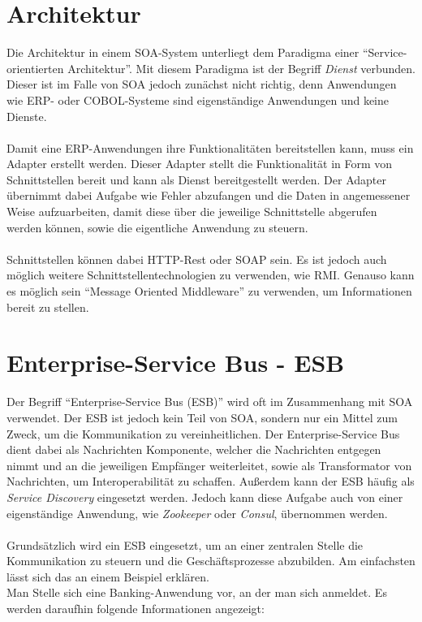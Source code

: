 \section{Architektur}
\label{sec:SoaArchitektur}
Die Architektur in einem SOA-System unterliegt dem Paradigma einer "`Service-orientierten Architektur"'. Mit diesem Paradigma ist der Begriff \textit{Dienst} verbunden. Dieser ist im Falle von SOA jedoch zunächst nicht richtig, denn Anwendungen wie ERP- oder COBOL-Systeme sind eigenständige Anwendungen und keine Dienste.
\\\\
Damit eine ERP-Anwendungen ihre Funktionalitäten bereitstellen kann, muss ein Adapter erstellt werden. Dieser Adapter stellt die Funktionalität in Form von Schnittstellen bereit und kann als Dienst bereitgestellt werden. Der Adapter übernimmt dabei Aufgabe wie Fehler abzufangen und die Daten in angemessener Weise aufzuarbeiten, damit diese über die jeweilige Schnittstelle abgerufen werden können, sowie die eigentliche Anwendung zu steuern.
\\\\
Schnittstellen können dabei HTTP-Rest oder SOAP sein. Es ist jedoch auch möglich weitere Schnittstellentechnologien zu verwenden, wie RMI. Genauso kann es möglich sein "`Message Oriented Middleware"' zu verwenden, um Informationen bereit zu stellen.

\section{Enterprise-Service Bus - ESB}
\label{sec:esb}
Der Begriff "`Enterprise-Service Bus (ESB)"' wird oft im Zusammenhang mit SOA verwendet. Der ESB ist jedoch kein Teil von SOA, sondern nur ein Mittel zum Zweck, um die Kommunikation zu vereinheitlichen. Der Enterprise-Service Bus dient dabei als Nachrichten Komponente, welcher die Nachrichten entgegen nimmt und an die jeweiligen Empfänger weiterleitet, sowie als Transformator von Nachrichten, um Interoperabilität zu schaffen. Außerdem kann der ESB häufig als \textit{Service Discovery} eingesetzt werden. Jedoch kann diese Aufgabe auch von einer eigenständige Anwendung, wie \textit{Zookeeper} oder \textit{Consul}, übernommen werden.
\\\\
Grundsätzlich wird ein ESB eingesetzt, um an einer zentralen Stelle die Kommunikation zu steuern und die Geschäftsprozesse abzubilden. Am einfachsten lässt sich das an einem Beispiel erklären.
\\
Man Stelle sich eine Banking-Anwendung vor, an der man sich anmeldet. Es werden daraufhin folgende Informationen angezeigt:

